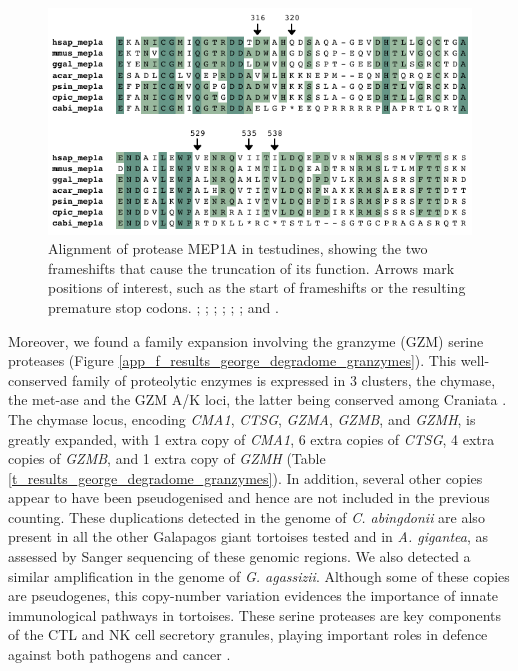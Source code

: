 \begin{figure}[t!]
    \begin{center}
        \includegraphics[width=\textwidth]{figures/alignment_mep1a.pdf}
        \caption[Alignment of protease MEP1A in testudines]{\footnotesize Alignment of protease MEP1A in testudines, showing the two frameshifts that cause the truncation of its function. Arrows mark positions of interest, such as the start of frameshifts or the resulting premature stop codons. \hsap; \mmus; \acar; \ggal; \psin; \cpic; and \cabi.}
        \label{f_results_george_degradome_alignment_mep1a}
    \end{center}
\end{figure}

Moreover, we found a family expansion involving the granzyme (GZM) serine proteases (Figure \ref{app_f_results_george_degradome_granzymes}).
This well-conserved family of proteolytic enzymes is expressed in 3 clusters, the chymase, the met-ase and the GZM A/K loci, the latter being conserved among Craniata \cite{Akula2015}.
The chymase locus, encoding \textit{CMA1}, \textit{CTSG}, \textit{GZMA}, \textit{GZMB}, and \textit{GZMH}, is greatly expanded, with 1 extra copy of \textit{CMA1}, 6 extra copies of \textit{CTSG}, 4 extra copies of \textit{GZMB}, and 1 extra copy of \textit{GZMH} (Table \ref{t_results_george_degradome_granzymes}).
In addition, several other copies appear to have been pseudogenised and hence are not included in the previous counting.
These duplications detected in the genome of \textit{C. abingdonii} are also present in all the other Galapagos giant tortoises tested and in \textit{A. gigantea}, as assessed by Sanger sequencing of these genomic regions.
We also detected a similar amplification in the genome of \textit{G. agassizii}.
Although some of these copies are pseudogenes, this copy-number variation evidences the importance of innate immunological pathways in tortoises. %
These serine proteases are key components of the CTL and NK cell secretory granules, playing important roles in defence against both pathogens and cancer \cite{Akula2015}.

